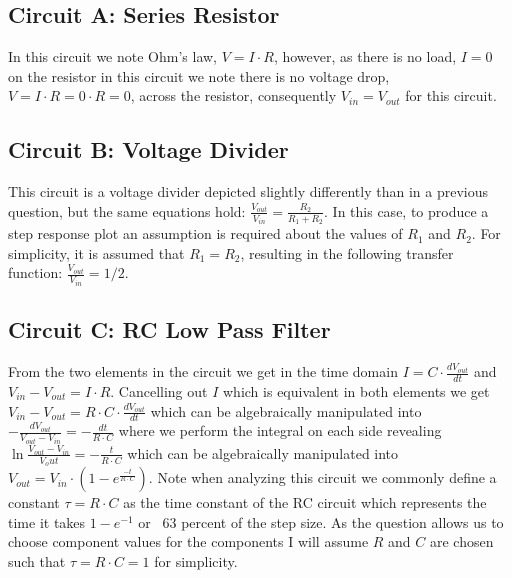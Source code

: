 \documentclass[main.tex]{subfiles}
\begin{document}

\subsection{Circuit A: Series Resistor}
In this circuit we note Ohm's law, $V = I \cdot R$, however, as there is no load, $I=0$ on the resistor in this circuit we note there is no voltage drop, $V=I \cdot R=0 \cdot R=0$, across the resistor, consequently $V_{in} = V_{out}$ for this circuit. 


\subsection{Circuit B: Voltage Divider}
This circuit is a voltage divider depicted slightly differently than in a previous question, but the same equations hold: $\frac{V_{out}}{V_{in}} = \frac{R_2}{R_1 + R_2}$. In this case, to produce a step response plot an assumption is required about the values of $R_1$ and $R_2$. For simplicity, it is assumed that $R_1 = R_2$, resulting in the following transfer function: $\frac{V_{out}}{V_{in}} = 1/2$.


\subsection{Circuit C: RC Low Pass Filter}
From the two elements in the circuit we get in the time domain $I = C \cdot \frac{dV_{out}}{dt}$ and $V_{in} - V_{out} = I \cdot R$. Cancelling out $I$ which is equivalent in both elements we get $V_{in} - V_{out} = R \cdot C \cdot \frac{dV_{out}}{dt}$ which can be algebraically manipulated into $-\frac{dV_{out}}{V_{out}-V_{in}} = -\frac{dt}{R \cdot C}$ where we perform the integral on each side revealing $\ln{\frac{V_{out}-V_{in}}{V_out}}=-\frac{t}{R \cdot C}$ which can be algebraically manipulated into $V_{out}=V_{in} \cdot (1-e^{\frac{-t}{R \cdot C}})$. Note when analyzing this circuit we commonly define a constant $\tau = R \cdot C$ as the time constant of the RC circuit which represents the time it takes $1-e^{-1}$ or ~63 percent of the step size. As the question allows us to choose component values for the components I will assume $R$ and $C$ are chosen such that $\tau = R \cdot C = 1$ for simplicity.
\end{document}
